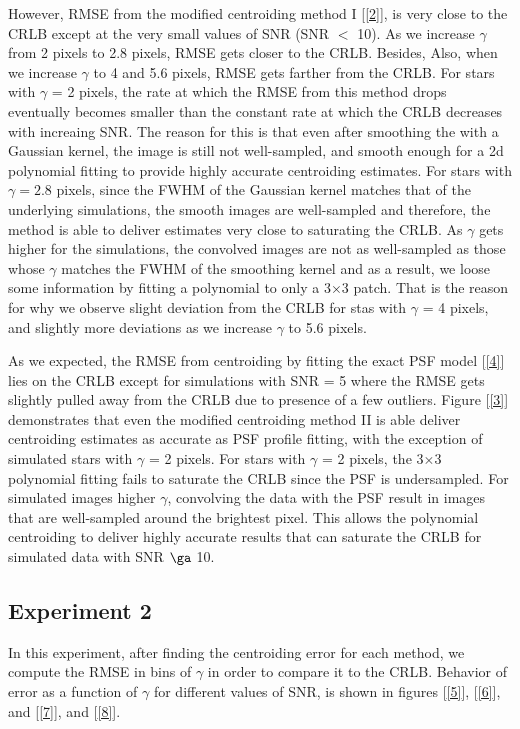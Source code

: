 \documentclass[12pt, preprint]{aastex}
\begin{document}
However, RMSE from the modified centroiding method I [\ref{2}],
is very close to the CRLB except at the very small values of SNR (SNR $<$ 10).
As we increase $\gamma$ from 2 pixels to 2.8 pixels, RMSE gets closer
to the CRLB. Besides, Also, when we increase $\gamma$ to
4 and 5.6 pixels, RMSE gets farther from the CRLB. For stars with $\gamma$ = 2 pixels, 
the rate at which the RMSE from this method drops
eventually becomes smaller than the constant rate at which the CRLB
decreases with increaing SNR. The reason for this is that even after smoothing
the with a Gaussian kernel, the image is still not well-sampled, and smooth enough
for a 2d polynomial fitting to provide highly accurate centroiding estimates.
For stars with $\gamma=2.8$ pixels, since the FWHM of the Gaussian kernel matches that 
of the underlying simulations, the smooth images are well-sampled and therefore, 
the method is able to deliver estimates very close to saturating the CRLB. As $\gamma$
gets higher for the simulations, the convolved images are not as well-sampled as those 
whose $\gamma$ matches the FWHM of the smoothing kernel and as a result, we loose
some information by fitting a polynomial to only a 3$\times$3 patch. That is the 
reason for why we observe slight deviation from the CRLB for stas with $\gamma$ = 4 pixels, and 
slightly more deviations as we increase $\gamma$ to 5.6 pixels.   
 
As we expected, the RMSE from centroiding by fitting the exact PSF model [\ref{4}]
lies on the CRLB except for simulations with SNR = 5 where the RMSE gets slightly pulled away
from the CRLB due to presence of a few outliers. Figure [\ref{3}] demonstrates that even the modified centroiding
 method II is able deliver centroiding estimates as accurate as PSF profile fitting, with the exception
of simulated stars with $\gamma$ = 2 pixels. For stars with $\gamma$ = 2 pixels, the 3$\times$3 polynomial
fitting fails to saturate the CRLB since the PSF is undersampled. For simulated images higher $\gamma$, convolving the
data with the PSF result in images that are well-sampled around the brightest pixel. This allows the 
polynomial centroiding to deliver highly accurate results that can saturate the CRLB for simulated
data with SNR $\ga$ 10.      


\subsection{Experiment 2}

In this experiment, after finding the centroiding error for each method, we
compute the RMSE in bins of $\gamma$ in order to compare it to the CRLB. 
Behavior of error as a function of $\gamma$ for different values of SNR,
is shown in figures [\ref{5}], [\ref{6}], and [\ref{7}], and [\ref{8}]. 
 
\end{document}
